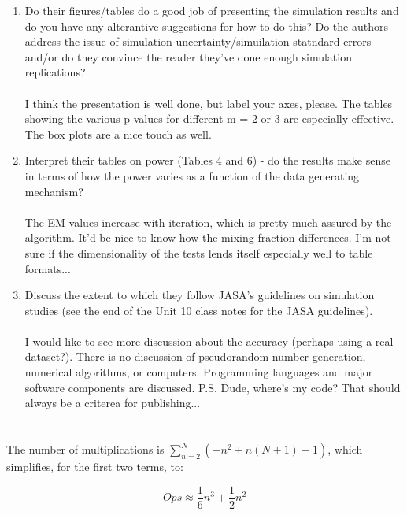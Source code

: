 \documentclass{article}\usepackage[]{graphicx}\usepackage[]{color}
\begin{document}
\begin{enumerate}
\item Do their figures/tables do a good job of presenting the simulation results and do you have any alterantive suggestions for how to do this?  Do the authors address the issue of simulation uncertainty/simuilation statndard errors and/or do they convince the reader they've done enough simulation replications?
\\\\
I think the presentation is well done, but label your axes, please.  The tables showing the various p-values for different m = 2 or 3 are especially effective.  The box plots are a nice touch as well.

\item Interpret their tables on power (Tables 4 and 6) - do the results make sense in terms of how the power varies as a function of the data generating mechanism?
\\\\
The EM values increase with iteration, which is pretty much assured by the algorithm.  It'd be nice to know how the mixing fraction differences.  I'm not sure if the dimensionality of the tests lends itself especially well to table formats...

\item Discuss the extent to which they follow JASA's guidelines on simulation studies (see the end of the Unit 10 class notes for the JASA guidelines).
\\\\
I would like to see more discussion about the accuracy (perhaps using a real dataset?).  There is no discussion of pseudorandom-number generation, numerical algorithms, or computers.  Programming languages and major software components are discussed.  P.S. Dude, where's my code?  That should always be a criterea for publishing...

\end{enumerate}

\section{}

\subsection{}

The number of multiplications is \( \sum_{n=2}^N (-n^2 + n(N+1)-1) \), which simplifies, for the first two terms, to:

\[ Ops \approx \frac{1}{6} n^3 + \frac{1}{2} n^2 \]
\end{document}
